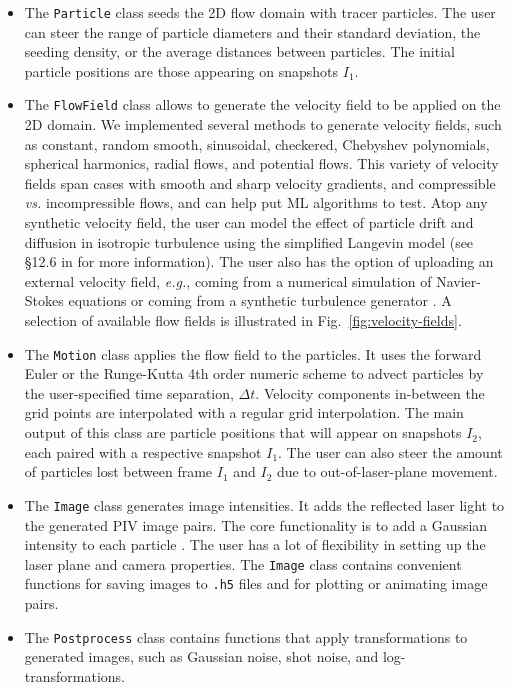 \documentclass[a4paper,fleqn]{cas-dc}
\begin{document}
\begin{itemize}
\item The \texttt{Particle} class seeds the 2D flow domain with tracer particles. The user can steer the range of particle diameters and their standard deviation, the seeding density, or the average distances between particles. The initial particle positions are those appearing on snapshots $I_1$.
\item The \texttt{FlowField} class allows to generate the velocity field to be applied on the 2D domain. We implemented several methods to generate velocity fields, such as constant, random smooth, sinusoidal, checkered, Chebyshev polynomials, spherical harmonics, radial flows, and potential flows. This variety of velocity fields span cases with smooth and sharp velocity gradients, and compressible \textit{vs.} incompressible flows, and can help put ML algorithms to test. Atop any synthetic velocity field, the user can model the effect of particle drift and diffusion in isotropic turbulence using the simplified Langevin model (see \S12.6 in \cite{pope2001turbulent} for more information). The user also has the option of uploading an external velocity field, \textit{e.g.}, coming from a numerical simulation of Navier-Stokes equations or coming from a synthetic turbulence generator \citep{saad2017scalable, richards2018fast}. A selection of available flow fields is illustrated in Fig.~\ref{fig:velocity-fields}.
\item The \texttt{Motion} class applies the flow field to the particles. It uses the forward Euler or the Runge-Kutta 4th order numeric scheme to advect particles by the user-specified time separation, $\Delta t$. Velocity components in-between the grid points are interpolated with a regular grid interpolation. The main output of this class are particle positions that will appear on snapshots $I_2$, each paired with a respective snapshot $I_1$. The user can also steer the amount of particles lost between frame $I_1$ and $I_2$ due to out-of-laser-plane movement.
\item The \texttt{Image} class generates image intensities. It adds the reflected laser light to the generated PIV image pairs. The core functionality is to add a Gaussian intensity to each particle \citep{olsen2000out, rabault2017performing}. The user has a lot of flexibility in setting up the laser plane and camera properties. The \texttt{Image} class contains convenient functions for saving images to \texttt{.h5} files and for plotting or animating image pairs.
\item The \texttt{Postprocess} class contains functions that apply transformations to generated images, such as Gaussian noise, shot noise, and log-transformations.
\end{itemize}
\end{document}

